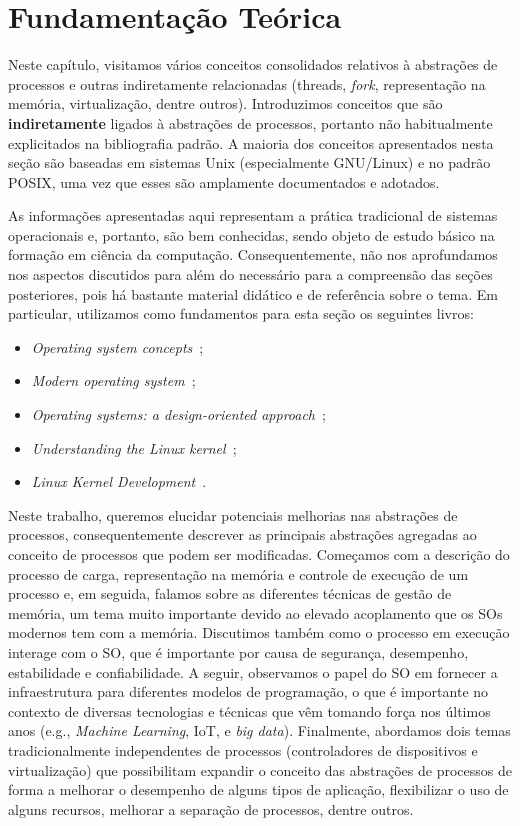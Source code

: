 \chapter{Fundamentação Teórica}
\label{cap:fundamentacao}

Neste capítulo, visitamos vários conceitos consolidados relativos à abstrações
de processos e outras indiretamente relacionadas (threads, \emph{fork},
representação na memória, virtualização, dentre outros). Introduzimos
conceitos que são \textbf{indiretamente} ligados à abstrações de processos,
portanto não habitualmente explicitados na bibliografia padrão. A maioria dos
conceitos apresentados nesta seção são baseadas em sistemas Unix (especialmente
GNU/Linux) e no padrão POSIX, uma vez que esses são amplamente documentados e
adotados.

As informações apresentadas aqui representam a prática tradicional de sistemas
operacionais e, portanto, são bem conhecidas, sendo objeto de estudo básico na
formação em ciência da computação. Consequentemente, não nos aprofundamos nos
aspectos discutidos para além do necessário para a compreensão das seções
posteriores, pois há bastante material didático e de referência sobre o tema.
Em particular, utilizamos como fundamentos para esta seção os seguintes livros:

\begin{itemize}
  \item \textit{Operating system concepts}~\citep{silberschatz};
  \item \textit{Modern operating system}~\citep{tanenbaum};
  \item \textit{Operating systems: a design-oriented approach}~\citep{crowley};
  \item \textit{Understanding the Linux kernel}~\citep{entendendo_kernel};
  \item \textit{Linux Kernel Development}~\citep{love}.
\end{itemize}

Neste trabalho, queremos elucidar potenciais melhorias nas abstrações de
processos, consequentemente descrever as principais abstrações agregadas ao
conceito de processos que podem ser modificadas. Começamos com a descrição do
processo de carga, representação na memória e controle de execução de um
processo e, em seguida, falamos sobre as diferentes técnicas de gestão de
memória, um tema muito importante devido ao elevado acoplamento que os SOs
modernos tem com a memória. Discutimos também como o processo em execução
interage com o SO, que é importante por causa de segurança, desempenho,
estabilidade e confiabilidade. A seguir, observamos o papel do SO em fornecer a
infraestrutura para diferentes modelos de programação, o que é importante no
contexto de diversas tecnologias e técnicas que vêm tomando força nos últimos
anos (e.g., \emph{Machine Learning}, IoT, e \emph{big data}). Finalmente,
abordamos dois temas tradicionalmente independentes de processos (controladores
de dispositivos e virtualização) que possibilitam expandir o
conceito das abstrações de processos de forma a melhorar o desempenho de alguns
tipos de aplicação, flexibilizar o uso de alguns recursos, melhorar a separação
de processos, dentre outros.

